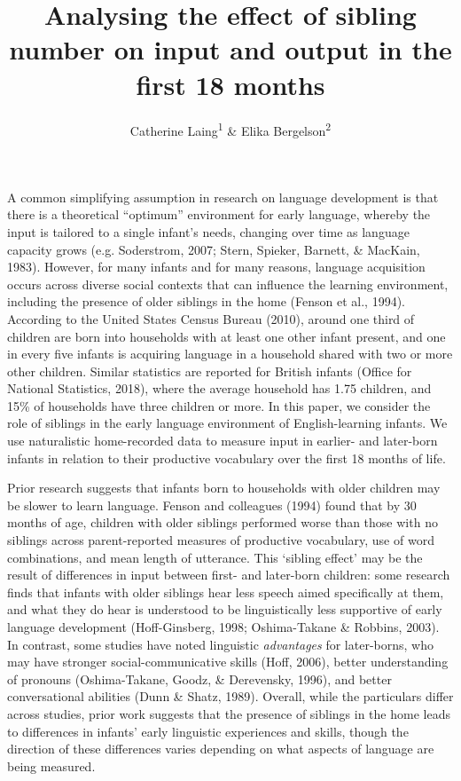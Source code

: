 \documentclass[
  english,
  man,floatsintext]{apa6}
\title{Analysing the effect of sibling number on input and output in the first 18 months}
\author{Catherine Laing\textsuperscript{1} \& Elika Bergelson\textsuperscript{2}}
\date{}
\affiliation{\vspace{0.5cm}\textsuperscript{1} University of York, York, UK\\\textsuperscript{2} Duke University, Durham, NC, USA}
\begin{document}
\maketitle

A common simplifying assumption in research on language development is that there is a theoretical ``optimum'' environment for early language, whereby the input is tailored to a single infant's needs, changing over time as language capacity grows (e.g. Soderstrom, 2007; Stern, Spieker, Barnett, \& MacKain, 1983). However, for many infants and for many reasons, language acquisition occurs across diverse social contexts that can influence the learning environment, including the presence of older siblings in the home (Fenson et al., 1994). According to the United States Census Bureau (2010), around one third of children are born into households with at least one other infant present, and one in every five infants is acquiring language in a household shared with two or more other children. Similar statistics are reported for British infants (Office for National Statistics, 2018), where the average household has 1.75 children, and 15\% of households have three children or more. In this paper, we consider the role of siblings in the early language environment of English-learning infants. We use naturalistic home-recorded data to measure input in earlier- and later-born infants in relation to their productive vocabulary over the first 18 months of life.

Prior research suggests that infants born to households with older children may be slower to learn language. Fenson and colleagues (1994) found that by 30 months of age, children with older siblings performed worse than those with no siblings across parent-reported measures of productive vocabulary, use of word combinations, and mean length of utterance. This `sibling effect' may be the result of differences in input between first- and later-born children: some research finds that infants with older siblings hear less speech aimed specifically at them, and what they do hear is understood to be linguistically less supportive of early language development (Hoff-Ginsberg, 1998; Oshima-Takane \& Robbins, 2003). In contrast, some studies have noted linguistic \emph{advantages} for later-borns, who may have stronger social-communicative skills (Hoff, 2006), better understanding of pronouns (Oshima-Takane, Goodz, \& Derevensky, 1996), and better conversational abilities (Dunn \& Shatz, 1989). Overall, while the particulars differ across studies, prior work suggests that the presence of siblings in the home leads to differences in infants' early linguistic experiences and skills, though the direction of these differences varies depending on what aspects of language are being measured.
\end{document}
